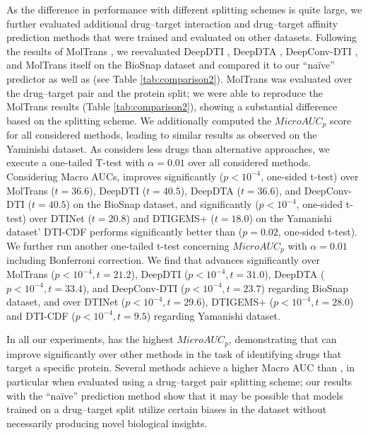 \documentclass{bioinfo}
\renewcommand{\cite}{\citep}
\begin{document}
As the difference in performance with different splitting schemes is
quite large, we further evaluated additional drug--target interaction
and drug--target affinity prediction methods that were trained and
evaluated on other datasets. Following the results of MolTrans
\cite{MolTrans2020}, we reevaluated DeepDTI \cite{DeepDTI2017},
DeepDTA \cite{DeepDTA2018}, DeepConv-DTI \cite{DeepConvDTI2019}, and
MolTrans itself on the BioSnap dataset \cite{BioSnap2018} and compared it to our
``na\"ive'' predictor as well as \name{} (see Table
\ref{tab:comparison2}).  MolTrans was evaluated over the drug--target
pair and the protein split; we were able to reproduce the MolTrans
results (Table \ref{tab:comparison2}), showing a substantial
difference based on the splitting scheme. We additionally computed the
$MicroAUC_p$ score for all considered methods, leading to similar 
results as observed on the Yaminishi dataset. As \name{} considers
less drugs than alternative approaches, we execute a one-tailed T-test
with $\alpha=0.01$ over all considered methods. Considering Macro
AUCs, \name{} improves significantly ($p<10^{-4}$, one-sided t-test)
over MolTrans ($t=36.6$), DeepDTI ($t=40.5$), DeepDTA ($t=36.6$), and DeepConv-DTI ($t=40.5$) on the BioSnap
dataset, and significantly ($p<10^{-4}$, one-sided t-test) over DTINet ($t=20.8$)
and DTIGEMS+ ($t=18.0$) on the Yamanishi dataset' DTI-CDF performs
significantly better than \name{} ($p=0.02$, one-sided t-test). %
We further run another one-tailed t-test concerning $MicroAUC_p$ with $\alpha=0.01$ including Bonferroni correction. We find that \name{} advances significantly over MolTrans ($p<10^{-4}, t=21.2$), DeepDTI ($p<10^{-4}, t=31.0$), DeepDTA ($p<10^{-4}, t=33.4$), and DeepConv-DTI ($p<10^{-4}, t=23.7$) regarding BioSnap dataset, and over DTINet ($p<10^{-4}, t=29.6$), DTIGEMS+ ($p<10^{-4}, t=28.0$) and DTI-CDF ($p<10^{-4}, t=9.5$) regarding Yamanishi dataset.

In all our experiments, \name{} has the highest $MicroAUC_p$,
demonstrating that \name{} can improve significantly over other methods in the task
of identifying drugs that target a specific protein. Several methods
achieve a higher Macro AUC than \name{}, in particular when evaluated
using a drug--target pair splitting scheme; our results with the
``na\"ive'' prediction method show that it may be possible that models
trained on a drug--target split utilize certain biases in the dataset
without necessarily producing novel biological insights.
\end{document}
